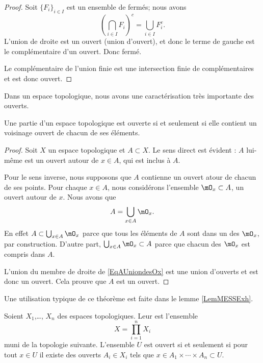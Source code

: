 \begin{proof}
    Soit \( \{ F_i \}_{i\in I} \) est un ensemble de fermés; nous avons
    \begin{equation}
        \left( \bigcap_{i\in I}F_i \right)^c=\bigcup_{i\in I}F_i^c.
    \end{equation}
    L'union de droite est un ouvert (union d'ouvert), et donc le terme de gauche est le complémentaire d'un ouvert. Donc fermé.

    Le complémentaire de l'union finie est une intersection finie de complémentaires et est donc ouvert.
\end{proof}

Dans un espace topologique, nous avons une caractérisation très importante des ouverts.
\begin{theorem}		\label{ThoPartieOUvpartouv}
    Une partie d'un espace topologique est ouverte si et seulement si elle contient un voisinage ouvert de chacun de ses éléments.
\end{theorem}

\begin{proof} 
    Soit \( X\) un espace topologique et \( A\subset X\). Le sens direct est évident : $A$ lui-même est un ouvert autour de $x\in A$, qui est inclus à $A$.

Pour le sens inverse, nous supposons que \( A\) contienne un ouvert atour de chacun de ses points. Pour chaque $x\in A$, nous considérons l'ensemble $\mO_x\subset A$, un ouvert autour de $x$. Nous avons que
\begin{equation}	\label{EqAUniondesOx}
	A=\bigcup_{x\in A}\mO_x.
\end{equation}
En effet $A\subset\bigcup_{x\in A}\mO_x$ parce que tous les éléments de $A$ sont dans un des $\mO_x$, par construction. D'autre part, $\bigcup_{x\in A}\mO_x\subset A$ parce que chacun des $\mO_x$ est compris dans $A$.

L'union du membre de droite de \eqref{EqAUniondesOx} est une union d'ouverts et est donc un ouvert. Cela prouve que $A$ est un ouvert.

\end{proof}
Une utilisation typique de ce théorème est faite dans le lemme \ref{LemMESSExh}.

\begin{definition}      \label{DefIINHooAAjTdY}
    Soient \( X_1\),\ldots, \( X_n\) des espaces topologiques. Leur  est l'ensemble
    \begin{equation}
        X=\prod_{i=1}^nX_i
    \end{equation}
    muni de la topologie suivante. L'ensemble \( U\) est ouvert si et seulement si pour tout \( x\in U\) il existe des ouverts \( A_i\in X_i \) tels que \( x\in A_1\times \cdots\times A_n\subset U\).
\end{definition}

